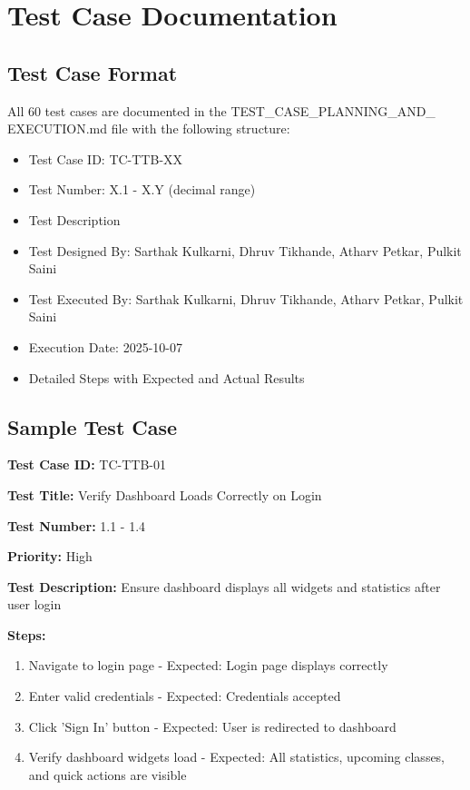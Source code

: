 \appendix
\chapter{Test Case Documentation}

\section{Test Case Format}
All 60 test cases are documented in the TEST\_CASE\_PLANNING\_AND\_\\EXECUTION.md file with the following structure:
\begin{itemize}[leftmargin=*]
    \item Test Case ID: TC-TTB-XX
    \item Test Number: X.1 - X.Y (decimal range)
    \item Test Description
    \item Test Designed By: Sarthak Kulkarni, Dhruv Tikhande, Atharv Petkar, Pulkit Saini
    \item Test Executed By: Sarthak Kulkarni, Dhruv Tikhande, Atharv Petkar, Pulkit Saini
    \item Execution Date: 2025-10-07
    \item Detailed Steps with Expected and Actual Results
\end{itemize}

\section{Sample Test Case}
\textbf{Test Case ID:} TC-TTB-01

\textbf{Test Title:} Verify Dashboard Loads Correctly on Login

\textbf{Test Number:} 1.1 - 1.4

\textbf{Priority:} High

\textbf{Test Description:} Ensure dashboard displays all widgets and statistics after user login

\textbf{Steps:}
\begin{enumerate}
    \item Navigate to login page - Expected: Login page displays correctly
    \item Enter valid credentials - Expected: Credentials accepted
    \item Click 'Sign In' button - Expected: User is redirected to dashboard
    \item Verify dashboard widgets load - Expected: All statistics, upcoming classes, and quick actions are visible
\end{enumerate}
